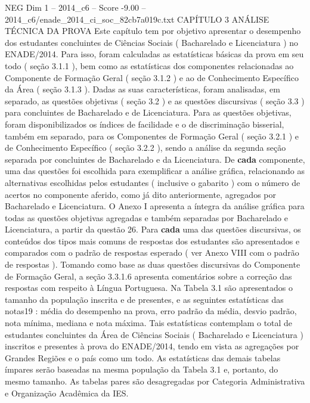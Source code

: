 \begin{textsample}{NEG Dim 1 – 2014\_c6 – Score -9.00 – 2014\_c6/enade\_2014\_ci\_soc\_82cb7a019c.txt}  \label{ex:f1_neg_015}
CAPÍTULO 3 ANÁLISE TÉCNICA DA PROVA Este capítulo tem por objetivo apresentar o desempenho dos estudantes concluintes de Ciências Sociais ( Bacharelado e Licenciatura ) no ENADE/2014.
Para isso, foram calculadas as estatísticas básicas da prova em seu todo ( seção 3.1.1 ), bem como as estatísticas dos componentes relacionadas ao Componente de Formação Geral ( seção 3.1.2 ) e ao de Conhecimento Específico da Área ( seção 3.1.3 ).
Dadas as suas características, foram analisadas, em separado, as questões objetivas ( seção 3.2 ) e as questões discursivas ( seção 3.3 ) para concluintes de Bacharelado e de Licenciatura.
Para as questões objetivas, foram disponibilizados os índices de facilidade e o de discriminação bisserial, também em separado, para os Componentes de Formação Geral ( seção 3.2.1 ) e de Conhecimento Específico ( seção 3.2.2 ), sendo a análise da segunda seção separada por concluintes de Bacharelado e da Licenciatura.
De \textbf{cada} componente, uma das questões foi escolhida para exemplificar a análise gráfica, relacionando as alternativas escolhidas pelos estudantes ( inclusive o gabarito ) com o número de acertos no componente aferido, como já dito anteriormente, agregados por Bacharelado e Licenciatura.
O Anexo I apresenta a íntegra da análise gráfica para todas as questões objetivas agregadas e também separadas por Bacharelado e Licenciatura, a partir da questão 26.
Para \textbf{cada} uma das questões discursivas, os conteúdos dos tipos mais comuns de respostas dos estudantes são apresentados e comparados com o padrão de respostas esperado ( ver Anexo VIII com o padrão de respostas ).
Tomando como base as duas questões discursivas do Componente de Formação Geral, a seção 3.3.1.6 apresenta comentários sobre a correção das respostas com respeito à Língua Portuguesa.
Na Tabela 3.1 são apresentados o tamanho da população inscrita e de presentes, e as seguintes estatísticas das notas19 : média do desempenho na prova, erro padrão da média, desvio padrão, nota mínima, mediana e nota máxima.
Tais estatísticas contemplam o total de estudantes concluintes da Área de Ciências Sociais ( Bacharelado e Licenciatura ) inscritos e presentes à prova do ENADE/2014, tendo em vista as agregações por Grandes Regiões e o país como um todo.
As estatísticas das demais tabelas ímpares serão baseadas na mesma população da Tabela 3.1 e, portanto, do mesmo tamanho.
As tabelas pares são desagregadas por Categoria Administrativa e Organização Acadêmica da IES.

\end{textsample}
